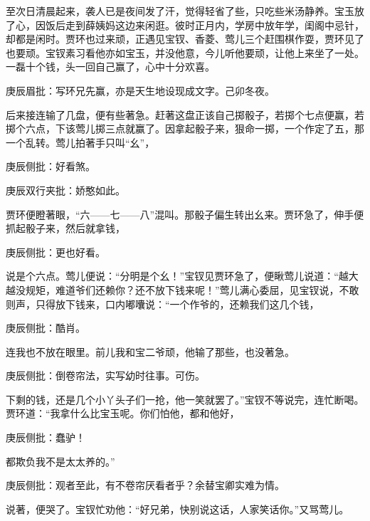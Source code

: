 \begin{parag}
    至次日清晨起来，袭人已是夜间发了汗，觉得轻省了些，只吃些米汤静养。宝玉放了心，因饭后走到薛姨妈这边来闲逛。彼时正月内，学房中放年学，闺阁中忌针，却都是闲时。贾环也过来顽，正遇见宝钗、香菱、莺儿三个赶围棋作耍，贾环见了也要顽。宝钗素习看他亦如宝玉，并没他意，今儿听他要顽，让他上来坐了一处。一磊十个钱，头一回自己赢了，心中十分欢喜。\begin{note}庚辰眉批：写环兄先赢，亦是天生地设现成文字。己卯冬夜。\end{note}后来接连输了几盘，便有些著急。赶著这盘正该自己掷骰子，若掷个七点便赢，若掷个六点，下该莺儿掷三点就赢了。因拿起骰子来，狠命一掷，一个作定了五，那一个乱转。莺儿拍著手只叫“幺”，\begin{note}庚辰侧批：好看煞。\end{note}\begin{note}庚辰双行夹批：娇憨如此。\end{note}贾环便瞪著眼，“六——七——八”混叫。那骰子偏生转出幺来。贾环急了，伸手便抓起骰子来，然后就拿钱，\begin{note}庚辰侧批：更也好看。\end{note}说是个六点。莺儿便说：“分明是个幺！”宝钗见贾环急了，便瞅莺儿说道：“越大越没规矩，难道爷们还赖你？还不放下钱来呢！”莺儿满心委屈，见宝钗说，不敢则声，只得放下钱来，口内嘟囔说：“一个作爷的，还赖我们这几个钱，\begin{note}庚辰侧批：酷肖。\end{note}连我也不放在眼里。前儿我和宝二爷顽，他输了那些，也没著急。\begin{note}庚辰侧批：倒卷帘法，实写幼时往事。可伤。\end{note}下剩的钱，还是几个小丫头子们一抢，他一笑就罢了。”宝钗不等说完，连忙断喝。贾环道：“我拿什么比宝玉呢。你们怕他，都和他好，\begin{note}庚辰侧批：蠢驴！\end{note}都欺负我不是太太养的。”\begin{note}庚辰侧批：观者至此，有不卷帘厌看者乎？余替宝卿实难为情。\end{note}说著，便哭了。宝钗忙劝他：“好兄弟，快别说这话，人家笑话你。”又骂莺儿。
\end{parag}



